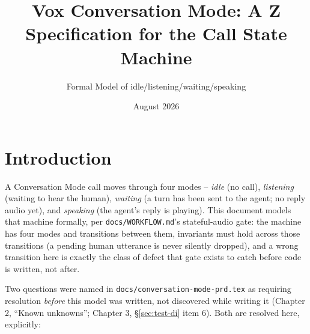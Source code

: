 \documentclass[a4paper,10pt,fleqn]{article}
\begin{document}
\title{Vox Conversation Mode: A Z Specification for the Call State Machine}
\author{Formal Model of idle/listening/waiting/speaking}
\date{August 2026}
\maketitle

\tableofcontents
\newpage

\section{Introduction}

A Conversation Mode call moves through four modes -- \emph{idle} (no call),
\emph{listening} (waiting to hear the human), \emph{waiting} (a turn has been
sent to the agent; no reply audio yet), and \emph{speaking} (the agent's reply
is playing). This document models that machine formally, per
\texttt{docs/WORKFLOW.md}'s stateful-audio gate: the machine has four modes
and transitions between them, invariants must hold across those transitions
(a pending human utterance is never silently dropped), and a wrong transition
here is exactly the class of defect that gate exists to catch before code is
written, not after.

Two questions were named in \texttt{docs/conversation-mode-prd.tex} as
requiring resolution \emph{before} this model was written, not discovered
while writing it (Chapter 2, ``Known unknowns''; Chapter 3,
\S\ref{sec:test-di} item 6). Both are resolved here, explicitly:
\end{document}
